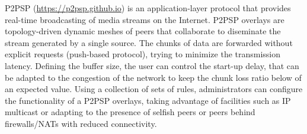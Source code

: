 P2PSP (\url{https://p2psp.github.io}) is an application-layer protocol
that provides real-time broadcasting of media streams on the
Internet. P2PSP overlays are topology-driven dynamic meshes of peers
that collaborate to diseminate the stream generated by a single
source. The chunks of data are forwarded without explicit requests
(push-based protocol), trying to minimize the transmission
latency. Defining the buffer size, the user can control the start-up
delay, that can be adapted to the congestion of the network to keep
the chunk loss ratio below of an expected value. Using a collection of
sets of rules, administrators can configure the functionality of a
P2PSP overlays, taking advantage of facilities such as IP multicast or
adapting to the presence of selfish peers or peers behind
firewalls/NATs with reduced connectivity.
